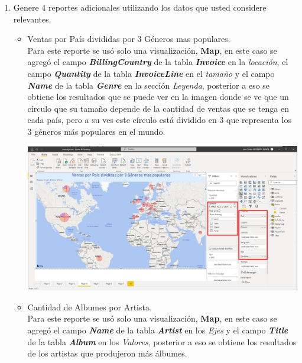 \documentclass{article}
\begin{document}
\begin{enumerate}[\tab 1.]
\begin{center}
        \end{center}
        \newpage
        \item Genere 4 reportes adicionales utilizando los datos que usted considere relevantes.\\[0.1in]
        \begin{itemize}
            \item Ventas por País divididas por 3 Géneros mas populares.\\[0.1in]
            Para este reporte se usó solo una visualización, \textbf{Map}, en este caso se agregó el campo \textit{\textbf{BillingCountry}} de la tabla \textit{\textbf{Invoice}} en la \textit{locación}, el campo \textit{\textbf{Quantity}} de la tabla \textit{\textbf{InvoiceLine}} en el \textit{tamaño} y el campo \textit{\textbf{Name}} de la tabla \textit{\textbf{Genre}} en la sección \textit{Leyenda}, posterior a eso se obtiene los resultados que se puede ver en la imagen donde se ve que un círculo que su tamaño depende de la cantidad de ventas que se tenga en cada país, pero a su ves este círculo está dividido en 3 que representa los 3 géneros más populares en el mundo.
            \begin{center}
                \includegraphics[width=13cm]{./images/23.1.png}
            \end{center}
            \newpage
            \item Cantidad de Albumes por Artista.\\[0.1in]
            Para este reporte se usó solo una visualización, \textbf{Map}, en este caso se agregó el campo \textit{\textbf{Name}} de la tabla \textit{\textbf{Artist}} en los \textit{Ejes} y el campo \textit{\textbf{Title}} de la tabla \textit{\textbf{Album}} en los \textit{Valores}, posterior a eso se obtiene los resultados de los artistas que produjeron más álbumes.
            \begin{center}

\end{center}
\end{itemize}
\end{enumerate}
\end{document}
